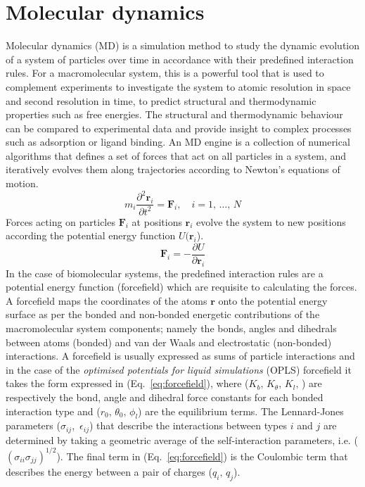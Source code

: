 \section{Molecular dynamics}\label{chapter:MD}
%
Molecular dynamics (MD) is a simulation method to study the dynamic evolution of a system of particles over time in accordance with their predefined interaction rules. For a macromolecular system, this is a powerful tool that is used to complement experiments to investigate the system to atomic resolution in space and second resolution in time, to predict structural and thermodynamic properties such as free energies.\cite{mcquarrie1965statistical} The structural and thermodynamic behaviour can be compared to experimental data and provide insight to complex processes such as adsorption or ligand binding. An MD engine is a collection of numerical algorithms that defines a set of forces that act on all particles in a system, and iteratively evolves them along trajectories according to Newton's equations of motion.
%
\begin{equation} \label{eq:newtons2nd}
m_i \frac{\partial^2\mathbf{r}_i}{\partial t^2}=\mathbf{F}_i,\quad  i = 1,\,\dots,\,N
\end{equation}
%
Forces acting on particles $\mathbf{F}_i$ at positions $\mathbf{r}_i$ evolve the system to new positions according  the potential energy function $U(\mathbf{r}_i$).
%
\begin{equation} \label{eq:newton}
\mathbf{F}_i = -\frac{\partial U}{\partial \mathbf{r}_i}
\end{equation}
%
In the case of biomolecular systems, the predefined interaction rules are a potential energy function (forcefield) which are requisite to calculating the forces. A forcefield maps the coordinates of the atoms $\mathbf{r}$ onto the potential energy surface as per the bonded and non-bonded energetic contributions of the macromolecular system components; namely the bonds, angles and dihedrals between atoms (bonded) and van der Waals and electrostatic (non-bonded) interactions.\cite{de2016role} A forcefield is usually expressed as sums of particle interactions and in the case of the \textit{optimised potentials for liquid simulations} (OPLS) forcefield \cite{jorgensen1988opls, jorgensen1996development} it takes the form expressed in (Eq.~\ref{eq:forcefield}), where ($K_b,\,K_{\theta},\,K_l,\,$) are respectively the bond, angle and dihedral force constants for each bonded interaction type and ($r_0,\, \theta_0,\, \phi_l$) are the equilibrium terms. The Lennard-Jones parameters ($\sigma_{ij}$,\, $\epsilon_{ij}$) that describe the interactions between types $i$ and $j$ are determined by taking a geometric average of the self-interaction parameters, i.e. ($(\sigma_{ii}\sigma_{jj})^{1/2}$). The final term in (Eq.~\ref{eq:forcefield}) is the Coulombic term that describes the energy between a pair of charges ($q_i,\,q_j$). 
